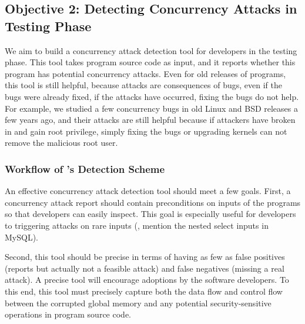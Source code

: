 





\subsection{Objective 2: Detecting Concurrency Attacks in Testing 
Phase}\label{sec:detect}

We aim to build a concurrency attack detection tool for developers in the 
testing phase. This tool takes program source code as input, and it reports 
whether this program has potential concurrency attacks. Even for old releases 
of programs, this tool is still helpful, because attacks are consequences of 
bugs, even if the bugs were already fixed, if the attacks have occurred, fixing 
the bugs do not help. For example, we studied a few concurrency bugs in old 
Linux and BSD releases a few years ago, and their attacks are still helpful 
because if attackers have broken in and gain root privilege, simply fixing the 
bugs or upgrading kernels can not remove the malicious root user.

\subsubsection{Workflow of \xxx's Detection Scheme}\label{sec:detect-arch}

An effective concurrency attack detection tool should meet a few goals. First, 
a concurrency attack report should contain preconditions on inputs of the 
programs so that developers can easily inspect. This goal is especially useful 
for developers to triggering attacks on rare inputs (\eg, mention the nested 
select inputs in MySQL).

Second, this tool should be precise in terms of having as few as false 
positives (reports but actually not a feasible attack) and false negatives 
(missing a real attack). A precise tool will encourage adoptions by the 
software developers. To this end, this tool must precisely capture both the 
data flow and control flow between the corrupted global memory and any 
potential security-sensitive operations in program source code. 

